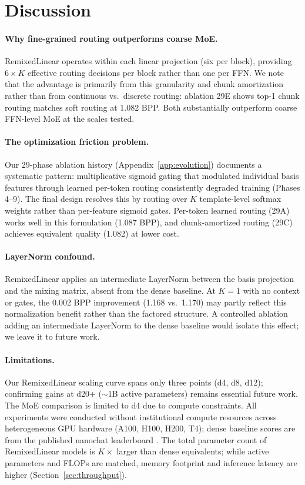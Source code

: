 \documentclass{article}
\begin{document}
\section{Discussion}

\paragraph{Why fine-grained routing outperforms coarse MoE.}
RemixedLinear operates within each linear projection (six per block), providing $6{\times}K$ effective routing decisions per block rather than one per FFN. We note that the advantage is primarily from this granularity and chunk amortization rather than from continuous vs.\ discrete routing: ablation 29E shows top-1 chunk routing matches soft routing at 1.082 BPP. Both substantially outperform coarse FFN-level MoE at the scales tested.

\paragraph{The optimization friction problem.}
Our 29-phase ablation history (Appendix~\ref{app:evolution}) documents a systematic pattern: multiplicative sigmoid gating that modulated individual basis features through learned per-token routing consistently degraded training (Phases 4--9). The final design resolves this by routing over $K$ template-level softmax weights rather than per-feature sigmoid gates. Per-token learned routing (29A) works well in this formulation (1.087 BPP), and chunk-amortized routing (29C) achieves equivalent quality (1.082) at lower cost.

\paragraph{LayerNorm confound.}
\label{sec:ln_confound}
RemixedLinear applies an intermediate LayerNorm between the basis projection and the mixing matrix, absent from the dense baseline. At $K{=}1$ with no context or gates, the 0.002 BPP improvement (1.168 vs.\ 1.170) may partly reflect this normalization benefit rather than the factored structure. A controlled ablation adding an intermediate LayerNorm to the dense baseline would isolate this effect; we leave it to future work.

\paragraph{Limitations.}
Our RemixedLinear scaling curve spans only three points (d4, d8, d12); confirming gains at d20+ ($\sim$1B active parameters) remains essential future work. The MoE comparison is limited to d4 due to compute constraints. All experiments were conducted without institutional compute resources across heterogeneous GPU hardware (A100, H100, H200, T4); dense baseline scores are from the published nanochat leaderboard \citep{karpathy2025nanochat}. The total parameter count of RemixedLinear models is $K{\times}$ larger than dense equivalents; while active parameters and FLOPs are matched, memory footprint and inference latency are higher (Section~\ref{sec:throughput}).
\end{document}
